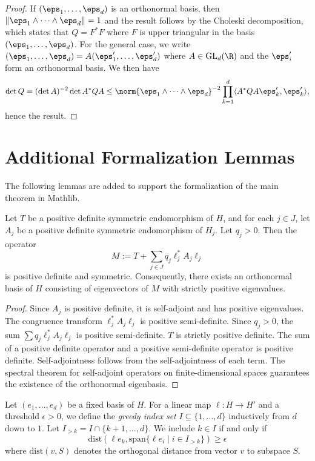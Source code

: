 \begin{proof}
If  $(\eps_{1}, \dots, \eps_{d})$ is an orthonormal basis, then $\|\eps_{1}\wedge \dots \wedge \eps_{d}\|=1$ and the result follows by  the Choleski decomposition, which states  that $Q=F^*F$ where $F$ is upper triangular in the basis $(\eps_{1}, \dots, \eps_{d})$. For the general case, we  write $(\eps_{1}, \dots, \eps_{d})=A(\eps'_{1}, \dots, \eps'_{d})$ where $A\in \mathrm{GL}_{d}(\R)$ and the $\eps'_{i}$ form an orthonormal basis. We then have
$$\det Q = (\det A)^{-2}\det A^*Q A \leq \norm{\eps_{1}\wedge \dots \wedge \eps_{d}}^{-2} \prod_{k=1}^d \langle A^*Q A \eps'_{k}, \eps'_{k}\rangle,$$
hence the result.
\end{proof}

\section{Additional Formalization Lemmas}

The following lemmas are added to support the formalization of the main theorem in Mathlib.

\begin{lemma}[Positivity of M]
\label{lem:M_pos_def}
Let $T$ be a positive definite symmetric endomorphism of $H$, and for each $j \in J$, let $A_j$ be a positive definite symmetric endomorphism of $H_j$. Let $q_j > 0$. Then the operator
$$M := T + \sum_{j \in J} q_j \ell_j^* A_j \ell_j$$
is positive definite and symmetric. Consequently, there exists an orthonormal basis of $H$ consisting of eigenvectors of $M$ with strictly positive eigenvalues.
\end{lemma}

\begin{proof}
Since $A_j$ is positive definite, it is self-adjoint and has positive eigenvalues. The congruence transform $\ell_j^* A_j \ell_j$ is positive semi-definite. Since $q_j > 0$, the sum $\sum q_j \ell_j^* A_j \ell_j$ is positive semi-definite. $T$ is strictly positive definite. The sum of a positive definite operator and a positive semi-definite operator is positive definite. Self-adjointness follows from the self-adjointness of each term. The spectral theorem for self-adjoint operators on finite-dimensional spaces guarantees the existence of the orthonormal eigenbasis.
\end{proof}

\begin{definition}
\label{def:greedy_sets}
Let $(e_1, \dots, e_d)$ be a fixed basis of $H$. For a linear map $\ell: H \to H'$ and a threshold $\epsilon > 0$, we define the \emph{greedy index set} $I \subseteq \{1, \dots, d\}$ inductively from $d$ down to $1$.
Let $I_{>k} = I \cap \{k+1, \dots, d\}$.
We include $k \in I$ if and only if
$$\mathrm{dist}(\ell e_k, \mathrm{span}\{\ell e_i \mid i \in I_{>k}\}) \ge \epsilon$$
where $\mathrm{dist}(v, S)$ denotes the orthogonal distance from vector $v$ to subspace $S$.
\end{definition}

